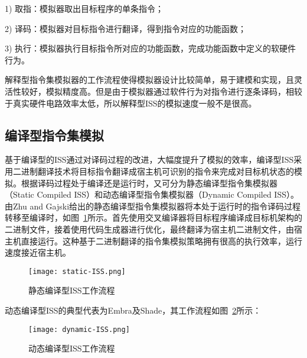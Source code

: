 1) 取指：模拟器取出目标程序的单条指令；


2) 译码：模拟器对目标指令进行翻译，得到指令对应的功能函数； 


3) 执行：模拟器执行目标指令所对应的功能函数，完成功能函数中定义的软硬件行为。


解释型指令集模拟器的工作流程使得模拟器设计比较简单，易于建模和实现，且灵活性较好，模拟精度高。但是由于模拟器通过软件行为对指令进行逐条译码，相较于真实硬件电路效率太低\cite{gutierrez2014sources}，所以解释型ISS的模拟速度一般不是很高。


\subsection{编译型指令集模拟}
基于编译型的ISS通过对译码过程的改进，大幅度提升了模拟的效率，编译型ISS采用二进制翻译技术\cite{李剑慧2007动态二进制翻译与优化技术研究}将目标指令翻译成宿主机可识别的指令来完成对目标机状态的模拟。根据译码过程处于编译还是运行时，又可分为静态编译型指令集模拟器（Static Compiled ISS）和动态编译型指令集模拟器（Dynamic Compiled ISS）\cite{刘晓燕2014一种}。由Zhu and Gajski\cite{zhu1999retargetable}给出的静态编译型指令集模拟器将本处于运行时的指令译码过程转移至编译时，如图~\ref{fig:static-ISS}所示。首先使用交叉编译器将目标程序编译成目标机架构的二进制文件，接着使用代码生成器进行优化，最终翻译为宿主机二进制文件，由宿主机直接运行。这种基于二进制翻译的指令集模拟策略拥有很高的执行效率，运行速度接近宿主机。
\begin{figure}[h]
  \centering
  \texttt{[image: static-ISS.png]}
  \caption{静态编译型ISS工作流程}
  \label{fig:static-ISS}
\end{figure}


动态编译型ISS的典型代表为Embra\cite{witchel1996embra}及Shade\cite{cmelik1995shade}，其工作流程如图~\ref{fig:dynamic-ISS}所示：
\begin{figure}[h]
  \centering
  \texttt{[image: dynamic-ISS.png]}
  \caption{动态编译型ISS工作流程}
  \label{fig:dynamic-ISS}
\end{figure}




